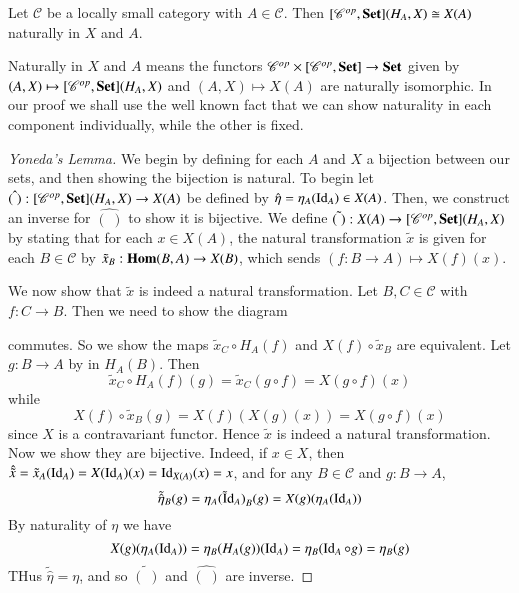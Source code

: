 \begin{theorem}
    Let $\mathscr{C}$ be a locally small category with $A \in \mathscr{C}$. Then $[\mathscr{C}^{op},\normalfont\textbf{Set}](H_A,X)\cong X(A)$ naturally in $X$ and $A$.
\end{theorem}
Naturally in $X$ and $A$ means the functors $\mathscr{C}^{op}\times[\mathscr{C}^{op},\normalfont\textbf{Set}]\rightarrow \normalfont\textbf{Set}$ given by $(A,X)\mapsto [\mathscr{C}^{op},\normalfont\textbf{Set}](H_A,X)$ and $(A,X)\mapsto X(A)$ are naturally isomorphic. In our proof we shall use the well known fact that we can show naturality in each component individually, while the other is fixed.
\begin{proof}[Yoneda's Lemma]
    We begin by defining for each $A$ and $X$ a bijection between our sets, and then showing the bijection is natural. To begin let $\hat{(\;)}:[\mathscr{C}^{op},\normalfont\textbf{Set}](H_A,X)\rightarrow X(A)$ be defined by $\hat{\eta} = \eta_A(\operatorname{Id}_A) \in X(A)$. Then, we construct an inverse for $\hat{(\;)}$ to show it is bijective. We define $\tilde{(\;)}:X(A)\rightarrow [\mathscr{C}^{op},\normalfont\textbf{Set}](H_A,X)$ by stating that for each $x \in X(A)$, the natural transformation $\tilde{x}$ is given for each $B \in \mathscr{C}$ by $\tilde{x}_B:\mathbf{Hom}(B,A)\rightarrow X(B)$, which sends $(f:B\rightarrow A)\mapsto X(f)(x)$. 

    We now show that $\tilde{x}$ is indeed a natural transformation. Let $B,C \in \mathscr{C}$ with $f:C\rightarrow B$. Then we need to show the diagram
    \begin{center}
    \end{center}
    commutes. So we show the maps $\tilde{x}_C\circ H_A(f)$ and $X(f)\circ \tilde{x}_B$ are equivalent. Let $g:B\rightarrow A$ by in $H_A(B)$. Then \begin{equation*}
        \tilde{x}_C\circ H_A(f)(g) = \tilde{x}_C(g\circ f) = X(g\circ f)(x)
    \end{equation*}
    while \begin{equation*}
        X(f)\circ \tilde{x}_B(g) = X(f)(X(g)(x)) = X(g\circ f)(x)
    \end{equation*}
    since $X$ is a contravariant functor. Hence $\tilde{x}$ is indeed a natural transformation. Now we show they are bijective. Indeed, if $x \in X$, then $\hat{\tilde{x}} = \tilde{x}_A(\operatorname{Id}_A) = X(\operatorname{Id}_A)(x) = \operatorname{Id}_{X(A)}(x) = x$, and for any $B \in \mathscr{C}$ and $g:B\rightarrow A$, \begin{equation*}
        \tilde{\hat{\eta}}_B(g) = \tilde{\eta_A(\operatorname{Id}_A)}_B(g) = X(g)(\eta_A(\operatorname{Id}_A))
    \end{equation*}
    By naturality of $\eta$ we have $$X(g)(\eta_A(\operatorname{Id}_A)) = \eta_B(H_A(g))(\operatorname{Id}_A) = \eta_B(\operatorname{Id}_A\circ g) = \eta_B(g)$$
    THus $\tilde{\hat{\eta}} = \eta$, and so $\tilde{(\;)}$ and $\hat{(\;)}$ are inverse.


\end{proof}
